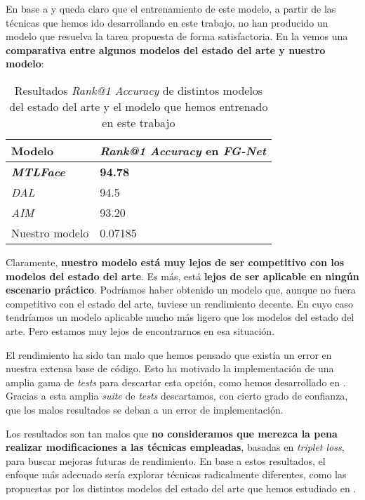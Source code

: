En base a  y  queda claro que el entrenamiento de este modelo, a partir de las técnicas que hemos ido desarrollando en este trabajo, no han producido un modelo que resuelva la tarea propuesta de forma satisfactoria. En la  vemos una \textbf{comparativa entre algunos modelos del estado del arte y nuestro modelo}:

\begin{table}[!hbtp]
\centering
\begin{tabular}{|l|l|}
    \hline
    Modelo                    & \textit{Rank@1 Accuracy} en \textit{FG-Net} \\
    \hline

    \textbf{\textit{MTLFace}} & \textbf{94.78}                              \\
    \textit{DAL}              & 94.5                                        \\
    \textit{AIM}              & 93.20                                       \\
    Nuestro modelo            & 0.07185                                     \\
    \hline

\end{tabular}
\caption{Resultados \textit{Rank@1 Accuracy} de distintos modelos del estado del arte y el modelo que hemos entrenado en este trabajo}
\label{table:estado_del_arte_y_mi_modelo}
\end{table}

Claramente, \textbf{nuestro modelo está muy lejos de ser competitivo con los modelos del estado del arte}. Es más, está \textbf{lejos de ser aplicable en ningún escenario práctico}. Podríamos haber obtenido un modelo que, aunque no fuera competitivo con el estado del arte, tuviese un rendimiento decente. En cuyo caso tendríamos un modelo aplicable mucho más ligero que los modelos del estado del arte. Pero estamos muy lejos de encontrarnos en esa situación.

El rendimiento ha sido tan malo que hemos pensado que existía un error en nuestra extensa base de código. Esto ha motivado la implementación de una amplia gama de \textit{tests} para descartar esta opción, como hemos desarrollado en . Gracias a esta amplia \textit{suite} de \textit{tests} descartamos, con cierto grado de confianza, que los malos resultados se deban a un error de implementación.

Los resultados son tan malos que \textbf{no consideramos que merezca la pena realizar modificaciones a las técnicas empleadas}, basadas en \textit{triplet loss}, para buscar mejoras futuras de rendimiento. En base a estos resultados, el enfoque más adecuado sería explorar técnicas radicalmente diferentes, como las propuestas por los distintos modelos del estado del arte que hemos estudiado en .
